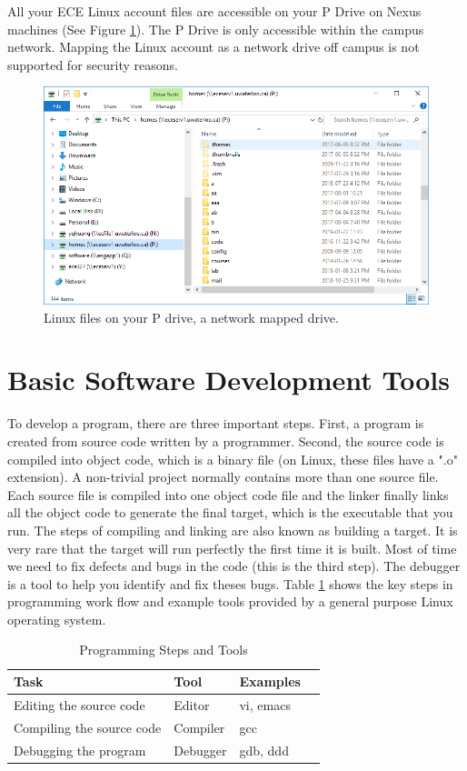 All your ECE Linux account files are accessible on your P Drive on Nexus machines (See Figure \ref{fig_lab0_P_Drive}). The P Drive is only accessible within the campus network. Mapping the Linux account as a network drive off campus is not supported for security reasons.
\begin{figure}[!htb]
  \centering
  \includegraphics[width=6in]{img/lab0/lab0_P_Drive}
  \caption{Linux files on your P drive, a network mapped drive.}
  \label{fig_lab0_P_Drive}
\end{figure}

\section{Basic Software Development Tools}

To develop a program, there are three important steps.
First, a program is created from source code written by a programmer. Second, the source code is compiled into object code, which is a binary file (on Linux, these files have a ".o" extension). A non-trivial project normally contains more than one source file. Each source file is compiled into one object code file and the linker finally links all the object code to generate the final target, which is the executable that you run. The steps of compiling and linking are also known as building a target. It is very rare that the target will run perfectly the first time it is built. Most of time we need to fix defects and bugs in the code (this is the third step). The debugger is a tool to help you identify and fix theses bugs. Table \ref{tb_prog_tools} shows the key steps in programming work flow and example tools provided by a general purpose Linux operating system.

\begin{table}[ht]
\begin{center}
\begin{tabular}{llll}
\hline
Task & Tool & Examples\\ \hline
Editing the source code &    Editor & vi, emacs \\  
Compiling the source code &  Compiler & gcc \\ 
Debugging the program	  &  Debugger & gdb, ddd \\ \hline 
\end{tabular}
\caption{Programming Steps and Tools}
\label{tb_prog_tools}
\end{center}
\end{table}

